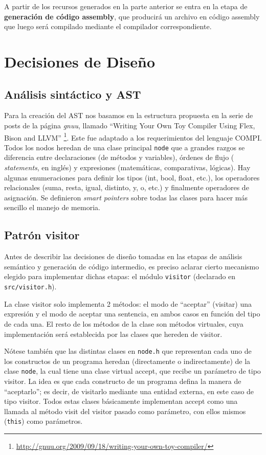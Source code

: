 \documentclass[12pt, a4paper, titlepage]{article}
\begin{document}
  A partir de los recursos generados en la parte anterior se entra en la etapa
  de {\bf generación de código assembly}, que producirá un archivo en código
  assembly que luego será compilado mediante el compilador correspondiente.

  \section{Decisiones de Diseño}\label{sec:design}

  \subsection{Análisis sintáctico y AST}

  Para la creación del AST nos basamos en la estructura propuesta en la serie de
  posts de la página {\em gnuu}, llamado ``Writing Your Own Toy Compiler Using
  Flex, Bison and LLVM''
  \footnote{\url{http://gnuu.org/2009/09/18/writing-your-own-toy-compiler/}}.
  Este fue adaptado a los requerimientos del lenguaje COMPI. Todos los nodos
  heredan de una clase principal {\tt node} que a grandes razgos se diferencia
  entre declaraciones (de métodos y variables), órdenes de flujo ({\em
  statements}, en inglés) y expresiones (matemáticas, comparativas, lógicas).
  Hay algunas enumeraciones para definir los tipos (int, bool, float, etc.), los
  operadores relacionales (suma, resta, igual, distinto, y, o, etc.) y
  finalmente operadores de asignación. Se definieron {\em smart pointers} sobre
  todas las clases para hacer más sencillo el manejo de memoria.

  \subsection{Patrón visitor}

  Antes de describir las decisiones de diseño tomadas en las etapas de  análisis
  semántico y generación de código intermedio, es preciso aclarar cierto
  mecanismo elegido para implementar dichas etapas: el módulo {\tt visitor} (declarado
  en {\tt src/visitor.h}).

	La clase visitor solo implementa 2 métodos: el modo de ``aceptar'' (visitar)
	una expresión y el modo de aceptar una sentencia, en ambos casos en función
	del tipo de cada una. El resto de los métodos de la clase son métodos
	virtuales, cuya implementación será establecida por las clases que hereden de
	visitor.

	Nótese también que las distintas clases en {\tt node.h} que representan cada
	uno de los constructos de un programa heredan (directamente o indirectamente)
	de la clase {\tt node}, la cual tiene una clase virtual accept, que recibe un
	parámetro de tipo visitor. La idea es que cada constructo de un programa
	defina la manera de ``aceptarlo''; es decir, de visitarlo mediante una entidad
	externa, en este caso de tipo visitor. Todos estas clases básicamente
	implementan accept como una llamada al método visit del visitor pasado como
	parámetro, con ellos mismos ({\tt *this}) como parámetros.
\end{document}
